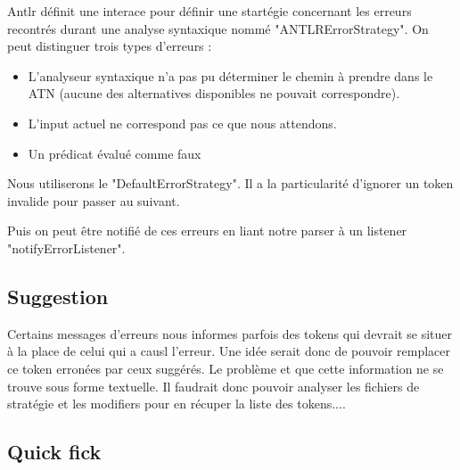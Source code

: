 \documentclass[
    iict, %
    il, %
]{heig-tb}
\begin{document}

Antlr définit une interace pour définir une startégie concernant les erreurs recontrés durant une analyse syntaxique nommé "ANTLRErrorStrategy".
On peut distinguer trois types d'erreurs :
\begin{itemize}
    \item L'analyseur syntaxique n'a pas pu déterminer le chemin à prendre dans le ATN (aucune des alternatives disponibles ne pouvait correspondre).
    \item L'input actuel ne correspond pas ce que nous attendons.
    \item Un prédicat évalué comme faux
\end{itemize}

Nous utiliserons le "DefaultErrorStrategy". Il a la particularité d'ignorer un token invalide pour passer au suivant.

Puis on peut être notifié de ces erreurs en liant notre parser à un listener "notifyErrorListener".



\subsection{Suggestion}
Certains messages d'erreurs nous informes parfois des tokens qui devrait se situer à la place de celui qui a causl l'erreur.
Une idée serait donc de pouvoir remplacer ce token erronées par ceux suggérés.
Le problème et que cette information ne se trouve sous forme textuelle.
Il faudrait donc pouvoir analyser les fichiers de stratégie et les modifiers pour en récuper la liste des tokens....


\subsection{Quick fick}
\end{document}
